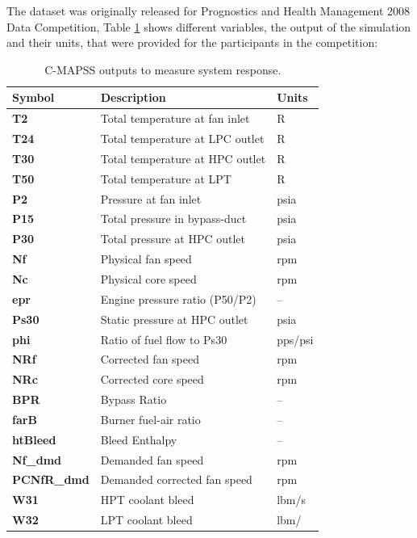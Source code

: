 The dataset was originally released for Prognostics and Health Management 2008 Data Competition, Table \ref{table:c-mapss-sensors} shows different variables, the output of the simulation and their units, that were provided for the participants in the competition:

\begin{table}[h]
    \centering
    \begin{tabular}{l|l|l}
        \hline
        \textbf{Symbol} & \textbf{Description} & \textbf{Units}\\
        \hline
        \textbf{T2} & Total temperature at fan inlet & R \\
        \textbf{T24} & Total temperature at LPC outlet & R \\
        \textbf{T30} & Total temperature at HPC outlet & R  \\
        \textbf{T50} &Total temperature at LPT & R\\
        \textbf{P2} & Pressure at fan inlet& psia\\
        \textbf{P15}& Total pressure in bypass-duct& psia\\
        \textbf{P30}& Total pressure at HPC outlet& psia\\
        \textbf{Nf}& Physical fan speed& rpm\\
        \textbf{Nc} & Physical core speed &rpm\\
        \textbf{epr}& Engine pressure ratio (P50/P2)& --\\
        \textbf{Ps30}& Static pressure at HPC outlet& psia\\
        \textbf{phi}& Ratio of fuel flow to Ps30& pps/psi\\
        \textbf{NRf}& Corrected fan speed &rpm\\
        \textbf{NRc}& Corrected core speed& rpm\\
        \textbf{BPR}& Bypass Ratio& --\\
        \textbf{farB}& Burner fuel-air ratio &--\\
        \textbf{htBleed}& Bleed Enthalpy &-- \\
        \textbf{Nf\_dmd} &Demanded fan speed& rpm\\
        \textbf{PCNfR\_dmd}& Demanded corrected fan speed &rpm\\
        \textbf{W31} & HPT coolant bleed & lbm/s \\
        \textbf{W32} & LPT coolant bleed & lbm/ \\
        \hline
    \end{tabular}
    \caption{C-MAPSS outputs to measure system response.}
    \label{table:c-mapss-sensors}
\end{table}

